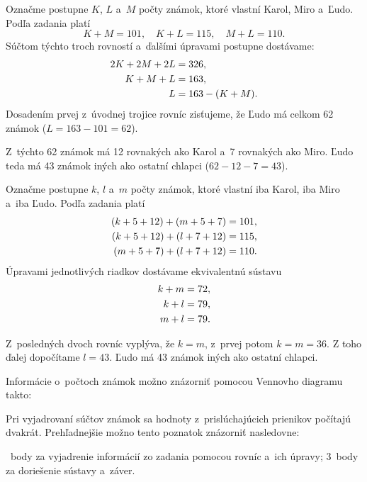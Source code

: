 {%
Označme postupne $K$, $L$ a~$M$ počty známok, ktoré vlastní Karol, Miro a~Ľudo.
Podľa zadania platí
$$
K+M =101,\quad K+L =115,\quad M+L=110.
$$
Súčtom týchto troch rovností a~ďalšími úpravami postupne dostávame:
$$
\aligned
2K+2M+2L &=326, \\
K+M+L &=163, \\
L &=163-(K+M).
\endaligned
$$
Dosadením prvej z~úvodnej trojice rovníc zisťujeme, že Ľudo má celkom 62 známok ($L=163-101 =62$).

Z~týchto 62 známok má 12 rovnakých ako Karol a~7 rovnakých ako Miro.
Ľudo teda má 43 známok iných ako ostatní chlapci ($62-12-7=43$).

\ineriesenie
Označme postupne $k$, $l$ a~$m$ počty známok, ktoré vlastní iba Karol, iba Miro a~iba Ľudo.
Podľa zadania platí
$$
\aligned
(k + 5 + 12) + (m + 5 + 7) &= 101, \\
(k + 5 + 12) + (l + 7 + 12) &= 115, \\
(m + 5 + 7) + (l + 7 + 12) &= 110.
\endaligned
$$
Úpravami jednotlivých riadkov dostávame ekvivalentnú sústavu
$$
\aligned
k+m&=72, \\
k+l&=79, \\
m+l&=79.
\endaligned
$$

Z~posledných dvoch rovníc vyplýva, že $k=m$, z~prvej potom $k = m = 36$.
Z toho ďalej dopočítame $l=43$.
Ľudo má 43 známok iných ako ostatní chlapci.

\poznamka
Informácie o~počtoch známok možno znázorniť pomocou Vennovho diagramu takto:
%

Pri vyjadrovaní súčtov známok sa hodnoty z~prislúchajúcich prienikov počítajú dvakrát.
Prehľadnejšie možno tento poznatok znázorniť nasledovne:
%


~body za vyjadrenie informácií zo zadania pomocou rovníc a~ich úpravy;
3~body za doriešenie sústavy a~záver.
\eres
}

